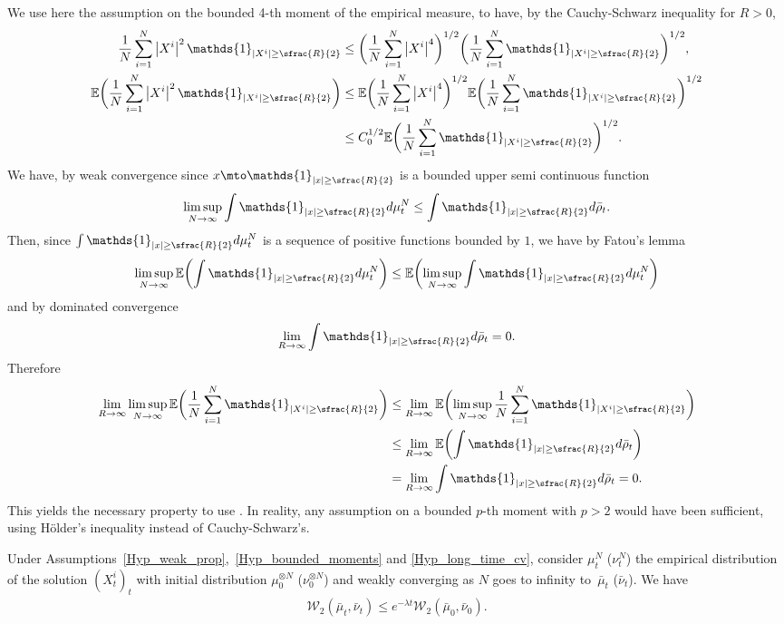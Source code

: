 \begin{remark}
We use here the assumption on the bounded 4-th moment of the empirical measure, to have, by the Cauchy-Schwarz inequality for $R>0$,
\begin{align*}
\frac{1}{N}\sum_{i=1}^N\left|X^i\right|^2\mathds{1}_{|X^i|\geq \sfrac{R}{2}}&\leq \biggl(\frac{1}{N}\sum_{i=1}^N\left|X^i\right|^{4}\biggr)^{1/2}\biggl(\frac{1}{N}\sum_{i=1}^N\mathds{1}_{|X^i|\geq \sfrac{R}{2}}\biggr)^{1/2},\\
\mathbb{E}\biggl(\frac{1}{N}\sum_{i=1}^N\left|X^i\right|^2\mathds{1}_{|X^i|\geq \sfrac{R}{2}}\biggr)&\leq \mathbb{E}\biggl(\frac{1}{N}\sum_{i=1}^N\left|X^i\right|^{4}\biggr)^{1/2}\mathbb{E}\biggl(\frac{1}{N}\sum_{i=1}^N\mathds{1}_{|X^i|\geq \sfrac{R}{2}}\biggr)^{1/2}\\
&\leq C_0^{1/2}\mathbb{E}\biggl(\frac{1}{N}\sum_{i=1}^N\mathds{1}_{|X^i|\geq \sfrac{R}{2}}\biggr)^{1/2}.
\end{align*}
We have, by weak convergence since $x\mto\mathds{1}_{|x|\geq \sfrac{R}{2}}$ is a bounded upper semi continuous function
\[
\limsup_{N\to\infty}\int\mathds{1}_{|x|\geq \sfrac{R}{2}}d\mu^N_t\leq\int\mathds{1}_{|x|\geq \sfrac{R}{2}}d\bar{\rho}_t.
\]
Then, since $\int\mathds{1}_{|x|\geq \sfrac{R}{2}}d\mu^N_t$ is a sequence of positive functions bounded by $1$, we have by Fatou's lemma
\[
\limsup_{N\to\infty}\mathbb{E}\biggl(\int\mathds{1}_{|x|\geq \sfrac{R}{2}}d\mu^N_t\biggr)\leq\mathbb{E}\biggl(\limsup_{N\to\infty}\int\mathds{1}_{|x|\geq \sfrac{R}{2}}d\mu^N_t\biggr)
\]
and by dominated convergence
\[
\lim_{R\to\infty}\int\mathds{1}_{|x|\geq \sfrac{R}{2}}d\bar{\rho}_t=0.
\]
Therefore
\begin{align*}
\lim_{R\to\infty}\limsup_{N\to\infty}\mathbb{E}\biggl(\frac{1}{N}\sum_{i=1}^N\mathds{1}_{|X^i|\geq \sfrac{R}{2}}\biggr)&\leq \lim_{R\to\infty}\mathbb{E}\biggl(\limsup_{N\to\infty}\frac{1}{N}\sum_{i=1}^N\mathds{1}_{|X^i|\geq \sfrac{R}{2}}\biggr)\\
&\leq \lim_{R\to\infty}\mathbb{E}\biggl(\int\mathds{1}_{|x|\geq \sfrac{R}{2}}d\bar{\rho}_t\biggr)\\
&=\lim_{R\to\infty}\int\mathds{1}_{|x|\geq \sfrac{R}{2}}d\bar{\rho}_t=0.
\end{align*}
This yields the necessary property to use \cite[Th.\,6.9]{villani2008optimal}. In reality, any assumption on a bounded $p$-th moment with $p>2$ would have been sufficient, using Hölder's inequality instead of Cauchy-Schwarz's.
\end{remark}

\begin{lemma}
Under Assumptions~\ref{Hyp_weak_prop},~\ref{Hyp_bounded_moments} and \ref{Hyp_long_time_cv}, consider $\mu^N_t$ (\resp $\nu^N_t$) the empirical distribution of the solution $(X^i_t)_t$ with initial distribution $\mu_0^{\otimes N}$ (\resp $\nu_0^{\otimes N}$) and weakly converging as $N$ goes to infinity to~$\bar{\mu}_t$ (\resp $\bar{\nu}_t$). We have
\begin{align*}
\mathcal{W}_2\left(\bar{\mu}_t, \bar{\nu}_t\right)\leq e^{-\lambda t}\mathcal{W}_2(\bar{\mu}_0, \bar{\nu}_0).
\end{align*}
\end{lemma}

